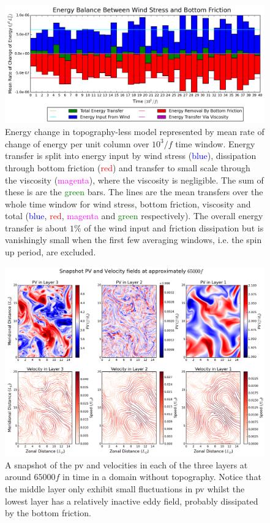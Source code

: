 \documentclass[12pt,a4paper]{report}
\begin{document}
  \begin{figure}
  	\centering
  	\includegraphics[width=\linewidth]{notopenergy}
  	\caption{Energy change in topography-less model represented by mean rate of change of energy per unit column over $10^{3}/f$ time window. Energy transfer is split into 
  		energy input by wind stress (\textcolor{blue}{blue}), dissipation through bottom friction (\textcolor{red}{red}) and transfer to small scale through the viscosity
  		(\textcolor{magenta}{magenta}), where the viscosity is negligible. The sum of these
  		is are the \textcolor{green}{green} bars. The lines are the mean transfers over the whole time window for wind stress, bottom friction, viscosity and total (\textcolor{blue}{blue}, \textcolor{red}{red}, \textcolor{magenta}{magenta} and \textcolor{green}{green} respectively). The overall energy transfer is about $1\%$
  		of the wind input and friction dissipation but is vanishingly small when the first
  		few averaging windows, i.e. the spin up period, are excluded.}
  	\label{fig:notopenergy}
  \end{figure}
  
  
  
  \begin{figure}
  	\centering
  	\includegraphics[width=0.8\linewidth]{notoppv}
  	\caption{ A snapshot of the \gls{pv} and velocities in each of the three layers
  		at around $65000 f$ in time in a domain without topography. Notice
  		that the middle layer only exhibit small fluctuations in \gls{pv} whilst
  		the lowest layer has a relatively inactive eddy field, probably dissipated by the
  		bottom friction.}
  	\label{fig:notoppv}
  \end{figure}
  
\end{document}
